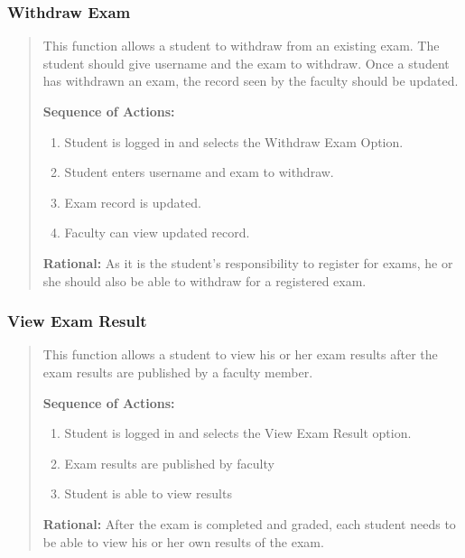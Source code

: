    \subsubsection{Withdraw Exam} 
   \begin{quote} %
         This function allows a student to withdraw from an existing exam. The
         student should give username and the exam to withdraw. Once a
         student has withdrawn an exam, the record seen by the faculty should
         be updated.
         
         \textbf{Sequence of Actions:}
         \begin{enumerate}
            \item Student is logged in and selects the Withdraw Exam Option.
            \item Student enters username and exam to withdraw.
            \item Exam record is updated.
            \item Faculty can view updated record.
         \end{enumerate}

         \textbf{Rational:}
         As it is the student's responsibility to register for exams, he or she
         should also be able to withdraw for a registered exam.
   \end{quote} %

   \subsubsection{View Exam Result} 
   \begin{quote} %
         This function allows a student to view his or her exam results after
         the exam results are published by a faculty member.
         
         \textbf{Sequence of Actions:}
         \begin{enumerate}
            \item Student is logged in and selects the View Exam Result option.
            \item Exam results are published by faculty
            \item Student is able to view results
         \end{enumerate}

         \textbf{Rational:}
         After the exam is completed and graded, each student needs to be able
         to view his or her own results of the exam.
   \end{quote} %
